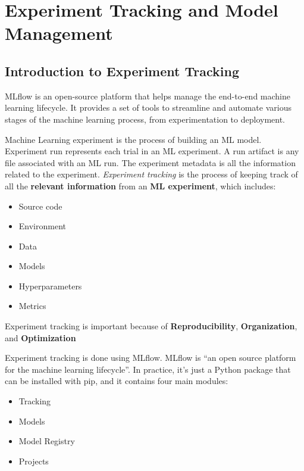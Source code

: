 \documentclass[letterpaper,12pt,notitlepage,twoside]{report}
\begin{document}
\chapter{Experiment Tracking and Model Management} \label{ch:2}


\section{Introduction to Experiment Tracking}

 \begin{funfact}[frametitle=\facttitlep{Fun Fact}{MLflow}]
MLflow is an open-source platform that helps manage the end-to-end machine learning lifecycle. It provides a set of tools to streamline and automate various stages of the machine learning process, from experimentation to deployment. 
\end{funfact}

Machine Learning experiment is the process of building an ML model. Experiment run represents each trial in an ML experiment. A run artifact is any file associated with an ML run. The experiment metadata is all the information related to the experiment. \emph{Experiment tracking} is the process of keeping track of all the \textbf{relevant information} from an \textbf{ML experiment}, which includes:
\begin{itemize}[noitemsep, topsep=0pt]
	\item Source code
	\item Environment
	\item Data
	\item Models
	\item Hyperparameters
	\item Metrics
\end{itemize}

    \begin{mathaside}[frametitle=\mathtitle{Why is Experiment Tracking \color{firebrick}{so important}}]
      Experiment tracking is important because of \textbf{Reproducibility}, \textbf{Organization}, and \textbf{Optimization}
    \end{mathaside}

Experiment tracking is done using MLflow. MLflow is ``an open source platform for the machine learning lifecycle''. In practice, it's just a Python package that can be installed with pip, and it contains four main modules:
\begin{itemize}[noitemsep, topsep=0pt]
	\item Tracking
	\item Models
	\item Model Registry
	\item Projects
\end{itemize}
\end{document}
